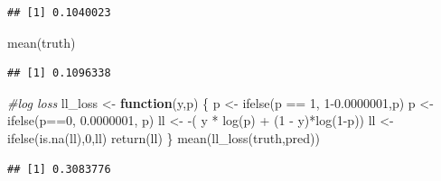 \documentclass[
]{article}
\newenvironment{Shaded}{\begin{snugshade}}{\end{snugshade}}
\newcommand{\AttributeTok}[1]{\textcolor[rgb]{0.77,0.63,0.00}{#1}}
\newcommand{\CommentTok}[1]{\textcolor[rgb]{0.56,0.35,0.01}{\textit{#1}}}
\newcommand{\ControlFlowTok}[1]{\textcolor[rgb]{0.13,0.29,0.53}{\textbf{#1}}}
\newcommand{\DecValTok}[1]{\textcolor[rgb]{0.00,0.00,0.81}{#1}}
\newcommand{\FloatTok}[1]{\textcolor[rgb]{0.00,0.00,0.81}{#1}}
\newcommand{\FunctionTok}[1]{\textcolor[rgb]{0.00,0.00,0.00}{#1}}
\newcommand{\NormalTok}[1]{#1}
\newcommand{\OtherTok}[1]{\textcolor[rgb]{0.56,0.35,0.01}{#1}}
\newcommand{\SpecialCharTok}[1]{\textcolor[rgb]{0.00,0.00,0.00}{#1}}
\begin{document}
\begin{Shaded}
\end{Shaded}

\begin{verbatim}
## [1] 0.1040023
\end{verbatim}

\begin{Shaded}
\begin{Highlighting}[]
\FunctionTok{mean}\NormalTok{(truth)}
\end{Highlighting}
\end{Shaded}

\begin{verbatim}
## [1] 0.1096338
\end{verbatim}

\begin{Shaded}
\begin{Highlighting}[]
\CommentTok{\#log loss}
\NormalTok{ll\_loss }\OtherTok{\textless{}{-}} \ControlFlowTok{function}\NormalTok{(y,p) \{}
\NormalTok{  p }\OtherTok{\textless{}{-}} \FunctionTok{ifelse}\NormalTok{(p }\SpecialCharTok{==} \DecValTok{1}\NormalTok{, }\DecValTok{1}\FloatTok{{-}0.0000001}\NormalTok{,p)}
\NormalTok{  p }\OtherTok{\textless{}{-}} \FunctionTok{ifelse}\NormalTok{(p}\SpecialCharTok{==}\DecValTok{0}\NormalTok{, }\FloatTok{0.0000001}\NormalTok{, p)}
\NormalTok{  ll }\OtherTok{\textless{}{-}} \SpecialCharTok{{-}}\NormalTok{( y }\SpecialCharTok{*} \FunctionTok{log}\NormalTok{(p) }\SpecialCharTok{+}\NormalTok{ (}\DecValTok{1} \SpecialCharTok{{-}}\NormalTok{ y)}\SpecialCharTok{*}\FunctionTok{log}\NormalTok{(}\DecValTok{1}\SpecialCharTok{{-}}\NormalTok{p))}
\NormalTok{  ll }\OtherTok{\textless{}{-}} \FunctionTok{ifelse}\NormalTok{(}\FunctionTok{is.na}\NormalTok{(ll),}\DecValTok{0}\NormalTok{,ll)}
  \FunctionTok{return}\NormalTok{(ll)}
\NormalTok{\}}
\FunctionTok{mean}\NormalTok{(}\FunctionTok{ll\_loss}\NormalTok{(truth,pred))}
\end{Highlighting}
\end{Shaded}

\begin{verbatim}
## [1] 0.3083776
\end{verbatim}
\end{document}
